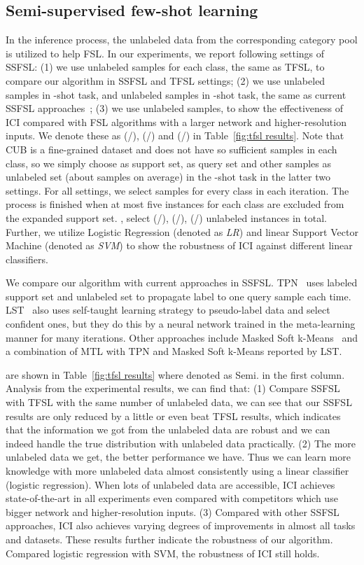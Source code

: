 \documentclass[10pt,letterpaper,twocolumn]{article}
\newcommand{\mypar}[1]{\smallskip\noindent {\bf #1}\enskip}
\begin{document}
\subsection{Semi-supervised few-shot learning}
\mypar{Settings.} 
In the inference process, the unlabeled data from the corresponding category pool is utilized to help FSL. 
In our experiments, we report following settings of SSFSL: 
(1) we use  unlabeled samples for each class, the same as TFSL, to compare our algorithm in SSFSL and TFSL settings; 
(2) we use  unlabeled samples in -shot task, and  unlabeled samples in -shot task, the same as current SSFSL approaches~\cite{sun2019learning}; 
(3) we use  unlabeled samples, to show the effectiveness of ICI compared with FSL algorithms with a larger network and higher-resolution inputs.
We denote these as (/), (/) and (/) in Table~\ref{fig:tfsl results}. 
Note that CUB is a fine-grained dataset and does not have so sufficient samples in each class, so we simply choose  as support set,  as query set and other samples as unlabeled set (about  samples on average) in the -shot task in the latter two settings. 
For all settings, we select  samples for every class in each iteration. The process is finished when at most five instances for each class are excluded from the expanded support set. \ie, select (/), (/), (/) unlabeled instances in total. 
Further, we utilize Logistic Regression (denoted as \emph{LR}) and linear Support Vector Machine (denoted as \emph{SVM}) to show the robustness of ICI against different linear classifiers. 

\mypar{Competitors.} 
We compare our algorithm with current approaches in SSFSL. TPN~\cite{liu2018learning} uses labeled support set and unlabeled set to propagate label to one query sample each time. LST~\cite{sun2019learning} also uses self-taught learning strategy to pseudo-label data and select confident ones, but they do this by a neural network trained in the meta-learning manner for many iterations. 
Other approaches include Masked Soft k-Means~\cite{ren2018meta} and a combination of MTL with TPN and Masked Soft k-Means reported by LST.

\mypar{Results.} are shown in Table~\ref{fig:tfsl results} where denoted as Semi. in the first column. 
Analysis from the experimental results, we can find that:
(1) Compare SSFSL with TFSL with the same number of unlabeled data, we can see that our SSFSL results are only reduced by a little or even beat TFSL results, which indicates that the information we got from the unlabeled data are robust and we can indeed handle the true distribution with unlabeled data practically.
(2) The more unlabeled data we get, the better performance we have. Thus we can learn more knowledge with more unlabeled data almost consistently using a linear classifier (\eg logistic regression). When lots of unlabeled data are accessible, ICI achieves state-of-the-art in all experiments even compared with competitors which use bigger network and higher-resolution inputs. 
(3) Compared with other SSFSL approaches, ICI also achieves varying degrees of improvements in almost all tasks and datasets. These results further indicate the robustness of our algorithm. Compared logistic regression with SVM, the robustness of ICI still holds.
\end{document}
